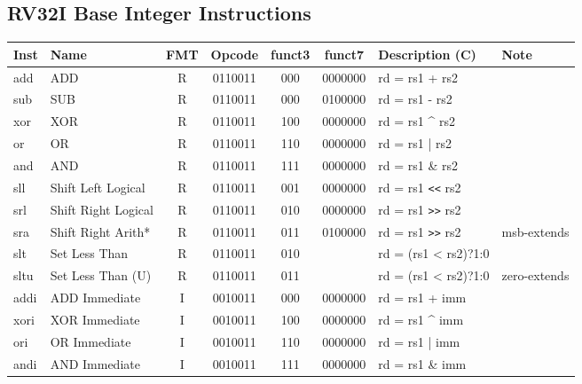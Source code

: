\subsection*{RV32I Base Integer Instructions}

\begin{tabular}
{T | l | c | c | c | c | T | l} \hline
\rm Inst & Name                    & FMT & \rm Opcode & \rm funct3 & \rm funct7 & \rm Description (C)          & Note \\ \hline
add      & ADD                     & R   & 0110011    & 000    & 0000000   & rd = rs1 + rs2               & \\
sub      & SUB                     & R   & 0110011    & 000    & 0100000   & rd = rs1 - rs2               & \\
xor      & XOR                     & R   & 0110011    & 100    & 0000000   & rd = rs1 \^{} rs2            & \\
or       & OR                      & R   & 0110011    & 110    & 0000000   & rd = rs1 | rs2               & \\
and      & AND                     & R   & 0110011    & 111    & 0000000   & rd = rs1 \& rs2              & \\
sll      & Shift Left Logical      & R   & 0110011    & 001    & 0000000   & rd = rs1 \verb|<<| rs2       & \\
srl      & Shift Right Logical     & R   & 0110011    & 010    & 0000000   & rd = rs1 \verb|>>| rs2       & \\
sra      & Shift Right Arith*      & R   & 0110011    & 011    & 0100000   & rd = rs1 \verb|>>| rs2       & msb-extends \\
slt      & Set Less Than           & R   & 0110011    & 010    &        & rd = (rs1 < rs2)?1:0         & \\
sltu     & Set Less Than (U)       & R   & 0110011    & 011    &        & rd = (rs1 < rs2)?1:0         & zero-extends \\ \hline
addi     & ADD Immediate           & I   & 0010011    & 000    & 0000000   & rd = rs1 + imm               & \\
xori     & XOR Immediate           & I   & 0010011    & 100    & 0000000   & rd = rs1 \^{} imm            & \\
ori      & OR Immediate            & I   & 0010011    & 110    & 0000000   & rd = rs1 | imm               & \\
andi     & AND Immediate           & I   & 0010011    & 111    & 0000000   & rd = rs1 \& imm              & \\

\end{tabular}

